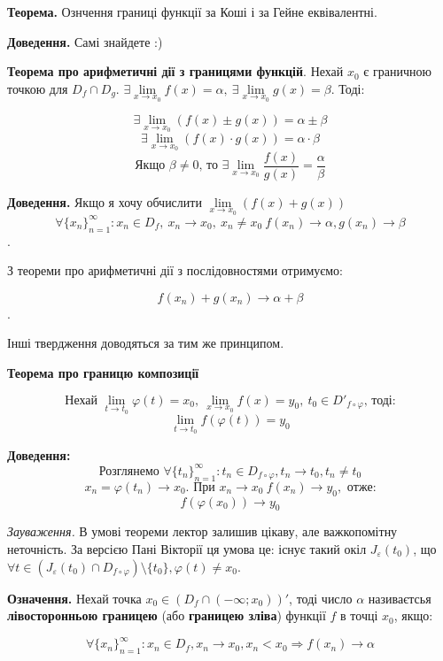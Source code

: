 \documentclass[12pt]{report}
\begin{document}
\textbf{Теорема.} Ознчення границі функції за Коші і за Гейне еквівалентні.

\textbf{Доведення.} Самі знайдете :)

\vspace{5mm}

\textbf{Теорема про арифметичні дії з границями функцій}. Нехай $x_0$ є граничною точкою для $D_f \cap D_g$. $\exists \lim\limits_{x \to x_0}f(x) = \alpha , \ \exists \lim\limits_{x \to x_0}g(x) = \beta$. Тоді:

$$\exists \lim_{x \to x_0}(f(x) \pm g(x)) = \alpha \pm \beta$$
$$\exists \lim_{x \to x_0}(f(x) \cdot g(x)) = \alpha \cdot \beta$$
$$\textrm{Якщо $\beta \neq 0$, то }\exists \lim_{x \to x_0}\frac{f(x)}{g(x)} = \frac{\alpha}{\beta}$$

\textbf{Доведення.} Якщо я хочу обчислити $\lim\limits_{x\to x_0}(f(x) + g(x))$
$$\forall \{x_n \}_{n=1}^{\infty} : x_n \in D_f,\ x_n \to x_0,\ x_n \neq x_0 \  f(x_n) \to \alpha, g(x_n) \to \beta$$.

З теореми про арифметичні дії з послідовностями отримуємо:

$$f(x_n) + g(x_n) \to \alpha + \beta$$.

Інші твердження доводяться за тим же принципом.

\textbf{Теорема про границю композиції}

$$\textrm{Нехай } \lim_{t \to t_0}\varphi(t) = x_0,\ \lim_{x \to x_0}f(x) = y_0,\ t_0 \in D'_{f \circ \varphi}\textrm{, тоді:}$$
$$\lim_{t\to t_0}f(\varphi(t)) = y_0$$

\textbf{Доведення:}
$$\textrm{Розглянемо } \forall \{ t_n \}_{n=1}^{\infty} : t_n \in D_{f \circ \varphi}, t_n \to t_0, t_n \neq t_0$$
$$x_n = \varphi(t_n) \to x_0. \textrm{ При } x_n \to x_0 \ f(x_n) \to y_0, \textrm{ отже:}$$
$$f(\varphi(x_0)) \to y_0$$

\textit{Зауваження.} В умові теореми лектор залишив цікаву, але важкопомітну неточність. За версією Пані Вікторії ця умова  це: існує такий окіл $J_{\varepsilon}(t_0)$, що $\forall t \in (J_{\varepsilon}(t_0) \cap D_{f \circ \varphi})\setminus \{ t_0\}, \varphi ( t ) \neq x_0$.

\vspace{5mm}

\textbf{Означення.} Нехай точка $x_0 \in (D_f \cap (-\infty;x_0))'$, тоді число $\alpha$ називаєтсья \textbf{лівосторонньою границею} (або \textbf{границею зліва}) функції $f$ в точці $x_0$, якщо:

$$\forall \{ x_n \}_{n=1}^{\infty} : x_n \in D_f, x_n \to x_0, x_n < x_0 \Longrightarrow f(x_n) \to \alpha$$
\end{document}
